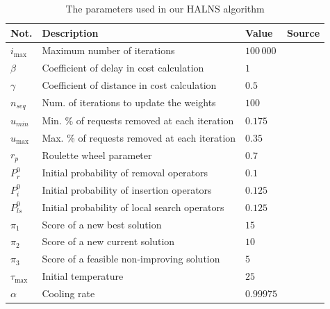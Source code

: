     \begin{table}[!ht]
    \centering
    {\renewcommand{\arraystretch}{1.5}
    \begin{tabular}{llll}
    \hline
    \textbf{Not.}          & \textbf{Description}                            & \textbf{Value} & \textbf{Source}             \\ \hline
    $i_{\mathrm{max}}$     & Maximum number of iterations                    & $100\,000$       &                             \\
    $\beta$                & Coefficient of delay in cost calculation        & $1$            &                             \\
    $\gamma$               & Coefficient of distance in cost calculation     & $0.5$          &                             \\
    $n_{seq}$              & Num. of iterations to update the weights        & $100$          & \cite{Masmoudi2016}         \\
    $u_{min}$              & Min. \% of requests removed at each iteration   & $0.175$        & \cite{Pisinger2007}         \\
    $u_{\mathrm{max}}$     & Max. \% of requests removed at each iteration   & $0.35$         & \cite{Pisinger2007}         \\
    $r_p$                  & Roulette wheel parameter                        & $0.7$          & \cite{Masmoudi2016}         \\
    $P^0_{r}$              & Initial probability of removal operators        & $0.1$          & \cite{Masmoudi2016}         \\
    $P^0_{i}$              & Initial probability of insertion operators      & $0.125$        & \cite{Masmoudi2016}         \\
    $P^0_{ls}$             & Initial probability of local search operators   & $0.125$        & \cite{Masmoudi2016}         \\
    $\pi_{1}$              & Score of a new best solution                    & $15$           & \cite{Masmoudi2020}         \\
    $\pi_{2}$              & Score of a new current solution                 & $10$           & \cite{Masmoudi2020}         \\
    $\pi_{3}$              & Score of a feasible non-improving solution      & $5$            & \cite{Masmoudi2020}         \\
    $\tau_{\mathrm{max}}$  & Initial temperature                             & $25$           & \cite{Leung2013}            \\
    $\alpha$               & Cooling rate                                    & $0.99975$      & \cite{Ropke2006, Demir2012}

    \end{tabular}
    }
    \caption{The parameters used in our HALNS algorithm}
    \label{tab:parameters}
    \end{table}
    
